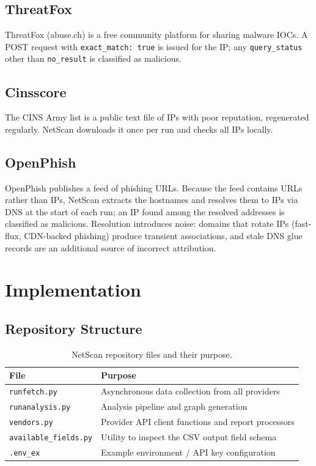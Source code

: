 \section{ThreatFox}

ThreatFox (abuse.ch) is a free community platform for sharing malware IOCs. A POST request with
\texttt{exact\_match: true} is issued for the IP; any \texttt{query\_status} other than
\texttt{no\_result} is classified as malicious.

\section{Cinsscore}

The CINS Army list is a public text file of IPs with poor reputation, regenerated regularly. NetScan
downloads it once per run and checks all IPs locally.

\section{OpenPhish}
\label{sec:openphish}

OpenPhish publishes a feed of phishing URLs. Because the feed contains URLs rather than IPs, NetScan
extracts the hostnames and resolves them to IPs via DNS at the start of each run; an IP found among
the resolved addresses is classified as malicious. Resolution introduces noise: domains that rotate
IPs (fast-flux, CDN-backed phishing) produce transient associations, and stale DNS glue records
\cite{zhang2024staleglue} are an additional source of incorrect attribution.

\chapter{Implementation}
\label{ch:implementation}

\section{Repository Structure}

\begin{table}[h]
  \centering
  \caption{NetScan repository files and their purpose.}
  \label{tab:repo}
  \begin{tabularx}{\linewidth}{lX}
    \toprule
    \textbf{File} & \textbf{Purpose} \\
    \midrule
    \texttt{runfetch.py}       & Asynchronous data collection from all providers \\
    \texttt{runanalysis.py}    & Analysis pipeline and graph generation \\
    \texttt{vendors.py}        & Provider API client functions and report processors \\
    \texttt{available\_fields.py} & Utility to inspect the CSV output field schema \\
    \texttt{.env\_ex}          & Example environment / API key configuration \\
    \bottomrule
  \end{tabularx}
\end{table}

